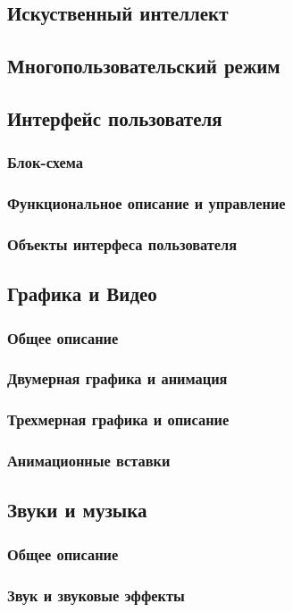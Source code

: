\documentclass[article,12pt, fleqn]{article}
\begin{document}
\begin{itemize}
\subsection{Искуственный интеллект}
\subsection{Многопользовательский режим}
\subsection{Интерфейс пользователя}
\subsubsection{Блок-схема}
\subsubsection{Функциональное описание и управление}
\subsubsection{Объекты интерфеса пользователя}
\subsection{Графика и Видео}
\subsubsection{Общее описание}
\subsubsection{Двумерная графика и анимация}
\subsubsection{Трехмерная графика и описание}
\subsubsection{Анимационные вставки}
\subsection{Звуки и музыка}
\subsubsection{Общее описание}
\subsubsection{Звук и звуковые эффекты}

\end{itemize}
\end{document}
